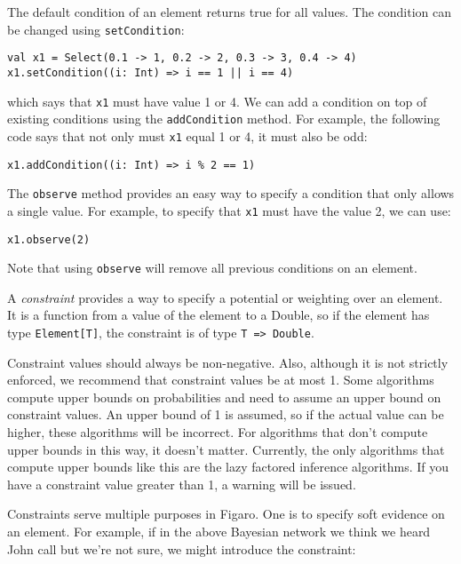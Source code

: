 The default condition of an element returns true for all values. The condition can be changed using \texttt{setCondition}:

\begin{flushleft}
\texttt{val x1 = Select(0.1 -> 1, 0.2 -> 2, 0.3 -> 3, 0.4 -> 4)
x1.setCondition((i: Int) => i == 1 || i == 4)}
\end{flushleft}

which says that \texttt{x1} must have value 1 or 4. We can add a condition on top of existing conditions using the \texttt{addCondition} method. For example, the following code says that not only must \texttt{x1} equal 1 or 4, it must also be odd:

\begin{flushleft}
\texttt{x1.addCondition((i: Int) => i \% 2 == 1)}
\end{flushleft}

The \texttt{observe} method provides an easy way to specify a condition that only allows a single value. For example, to specify that \texttt{x1} must have the value 2, we can use:

\begin{flushleft}
\texttt{x1.observe(2)}
\end{flushleft}

Note that using \texttt{observe} will remove all previous conditions on an element.

A \emph{constraint} provides a way to specify a potential or weighting over an element. It is a function from a value of the element to a Double, so if the element has type \texttt{Element[T]}, the constraint is of type \texttt{T => Double}.

Constraint values should always be non-negative. Also, although it is not strictly enforced, we recommend that constraint values be at most 1. Some algorithms compute upper bounds on probabilities and need to assume an upper bound on constraint values. An upper bound of 1 is assumed, so if the actual value can be higher, these algorithms will be incorrect. For algorithms that don't compute upper bounds in this way, it doesn't matter. Currently, the only algorithms that compute upper bounds like this are the lazy factored inference algorithms. If you have a constraint value greater than 1, a warning will be issued.

Constraints serve multiple purposes in Figaro. One is to specify soft evidence on an element. For example, if in the above Bayesian network we think we heard John call but we're not sure, we might introduce the constraint:

